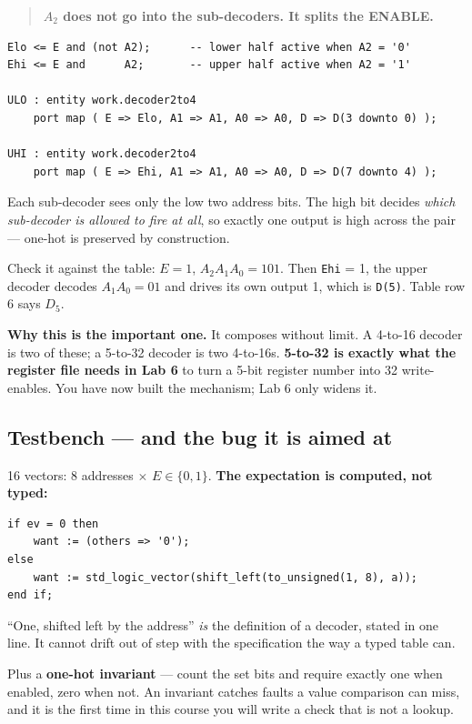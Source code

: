 \documentclass[11pt]{article}
\newcommand{\code}[1]{\texttt{#1}}
\begin{document}
\begin{quote}
\textbf{$A_2$ does not go into the sub-decoders. It splits the ENABLE.}
\end{quote}

\begin{lstlisting}
Elo <= E and (not A2);      -- lower half active when A2 = '0'
Ehi <= E and      A2;       -- upper half active when A2 = '1'

ULO : entity work.decoder2to4
    port map ( E => Elo, A1 => A1, A0 => A0, D => D(3 downto 0) );

UHI : entity work.decoder2to4
    port map ( E => Ehi, A1 => A1, A0 => A0, D => D(7 downto 4) );
\end{lstlisting}

Each sub-decoder sees only the low two address bits. The high bit decides
\emph{which sub-decoder is allowed to fire at all}, so exactly one output is high
across the pair --- one-hot is preserved by construction.

Check it against the table: $E=1$, $A_2A_1A_0 = 101$. Then \code{Ehi} = 1, the upper
decoder decodes $A_1A_0 = 01$ and drives its own output 1, which is \code{D(5)}.
Table row 6 says $D_5$. \checkmark

\textbf{Why this is the important one.} It composes without limit. A 4-to-16
decoder is two of these; a 5-to-32 decoder is two 4-to-16s. \textbf{5-to-32 is
exactly what the register file needs in Lab 6} to turn a 5-bit register number into
32 write-enables. You have now built the mechanism; Lab 6 only widens it.

\subsection*{Testbench --- and the bug it is aimed at}

16 vectors: 8 addresses $\times$ $E \in \{0,1\}$. \textbf{The expectation is
computed, not typed:}

\begin{lstlisting}
if ev = 0 then
    want := (others => '0');
else
    want := std_logic_vector(shift_left(to_unsigned(1, 8), a));
end if;
\end{lstlisting}

``One, shifted left by the address'' \emph{is} the definition of a decoder, stated
in one line. It cannot drift out of step with the specification the way a typed
table can.

Plus a \textbf{one-hot invariant} --- count the set bits and require exactly one
when enabled, zero when not. An invariant catches faults a value comparison can
miss, and it is the first time in this course you will write a check that is not a
lookup.
\end{document}
